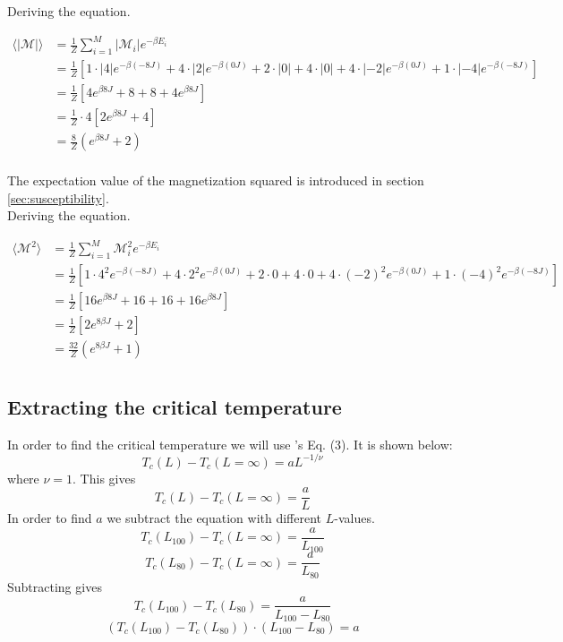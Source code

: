 \documentclass{article}
\begin{document}
Deriving the equation.

\begin{align*}
    \langle | \mathcal{M} | \rangle &= \frac{1}{Z} \sum _{i=1} ^M |\mathcal{M}_i| e^{- \beta E_i} \\
    &= \frac{1}{Z} \left[1 \cdot |4| e^{- \beta (-8J)} + 4 \cdot |2| e^{- \beta (0J)} + 2 \cdot |0| + 4 \cdot |0| + 4 \cdot |-2|
    e^{- \beta (0J)} + 1 \cdot |-4| e^{- \beta (-8J)} \right] \\
    &= \frac{1}{Z} \left[ 4 e^{\beta 8J} + 8 + 8 + 4 e^{ \beta 8J} \right] \\
    &= \frac{1}{Z} \cdot 4 \left[ 2 e^{\beta 8J} + 4 \right] \\
    &= \frac{8}{Z} \left( e^{\beta 8J} + 2 \right) \\
\end{align*}

The expectation value of the magnetization squared is introduced in section \ref{sec:susceptibility}. \\

Deriving the equation.

\begin{align*}
  \langle \mathcal{M}^2 \rangle &= \frac{1}{Z} \sum _{i=1} ^M \mathcal{M}_i^2 e^{- \beta E_i} \\
  &= \frac{1}{Z} \left[1 \cdot 4^2 e^{- \beta (-8J)} + 4 \cdot 2^2 e^{- \beta (0J)} + 2 \cdot 0 + 4 \cdot 0 + 4 \cdot (-2)^2 e^{- \beta (0J)} + 1 \cdot (-4)^2 e^{- \beta (-8J)} \right] \\
  &= \frac{1}{Z} \left[ 16 e^{\beta 8J} + 16 + 16 + 16 e^{ \beta 8J} \right] \\
  &= \frac{1}{Z} \left[ 2 e^{8 \beta J} + 2 \right] \\
  &= \frac{32}{Z} \left( e^{8 \beta J} + 1 \right) \\
\end{align*}


\subsection{Extracting the critical temperature}

In order to find the critical temperature we will use \cite{task}'s Eq. (3). It is shown below:
$$T_c(L)-T_c(L=\infty)=aL^{-1/\nu}$$
where $\nu=1$. This gives
$$T_c(L)-T_c(L=\infty)=\frac{a}{L}$$
In order to find $a$ we subtract the equation with different $L$-values.
$$T_c(L_{100})-T_c(L=\infty)=\frac{a}{L_{100}}$$
$$T_c(L_{80})-T_c(L=\infty)=\frac{a}{L_{80}}$$
Subtracting gives
$$T_c(L_{100})-T_c(L_{80})=\frac{a}{L_{100}-L_{80}}$$
$$(T_c(L_{100})-T_c(L_{80}))\cdot(L_{100}-L_{80})=a$$ \label{eq:finding-a}






\end{document}
